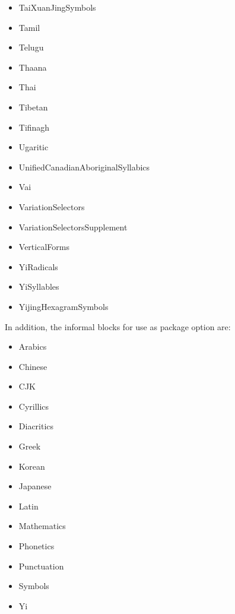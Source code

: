 ﻿\documentclass{article}
\newenvironment{itemlist}{%
  \begin{itemize}
	\setlength{\itemsep}{0pt}
	\setlength{\parsep}{0pt}
	\setlength{\topsep}{0pt}
	\setlength{\partopsep}{0pt}
	\setlength{\parskip}{0pt}
	\setlength{\labelsep}{5pt}}%
{
  \end{itemize}}
\begin{document}
\begin{multicols}{2}
\begin{itemlist}
				\item TaiXuanJingSymbols
				\item Tamil
				\item Telugu
				\item Thaana
				\item Thai
				\item Tibetan
				\item Tifinagh
				\item Ugaritic
				\item UnifiedCanadianAboriginalSyllabics
				\item Vai
				\item VariationSelectors
				\item VariationSelectorsSupplement
				\item VerticalForms
				\item YiRadicals
				\item YiSyllables
				\item YijingHexagramSymbols
			\end{itemlist}
		\end{multicols}

		In addition, the informal blocks for use as package option are:
		
		\begin{itemlist}
			\item Arabics
			\item Chinese
			\item CJK
			\item Cyrillics
			\item Diacritics
			\item Greek
			\item Korean
			\item Japanese
			\item Latin
			\item Mathematics
			\item Phonetics
			\item Punctuation
			\item Symbols
			\item Yi
		\end{itemlist}
			
\end{document}
